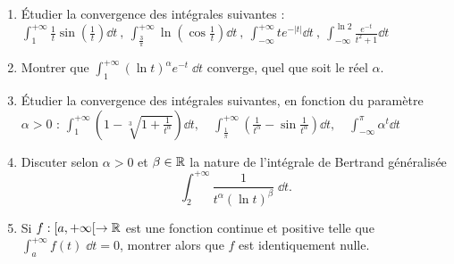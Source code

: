 \begin{frame}
\begin{miniexercice}
\begin{enumerate}
  \item \'Etudier la convergence des intégrales suivantes :  
  $\int_{1}^{+\infty} \frac{1}{t}\sin\left(\frac{1}{t}\right)\dd t \ ,\ 
  \int_{\frac{3}{\pi}}^{+\infty}\ln\left(\cos\frac{1}{t}\right)\dd t \ ,\ 
  \int_{-\infty}^{+\infty} te^{-|t|}\dd t \ ,\ 
  \int_{-\infty}^{\ln 2} \frac{e^{-t}}{t^2+1}\dd t$
  
  \item Montrer que $\int_1^{+\infty} (\ln t)^\alpha e^{-t}\;\dd t$ converge,
quel que soit le réel $\alpha$. 

  \item \'Etudier la convergence des intégrales suivantes, en fonction du paramètre $\alpha>0$ :
  $\int_{1}^{+\infty} \left(1-\sqrt[3]{1+\frac{1}{t^\alpha}}\right)\dd t , \quad
  \int_{\frac{1}{\pi}}^{+\infty} \left(\frac{1}{t^\alpha}-\sin\frac{1}{t^\alpha}\right)\dd t , \quad
  \int_{-\infty}^{\pi} \alpha^t \dd t$
  
  \item Discuter selon $\alpha>0$ et $\beta \in \mathbb{R}$ la nature de l'intégrale 
  de Bertrand généralisée
  $$\int_2^{+\infty} \frac{1}{t^\alpha(\ln t)^{\beta}}\;\dd t.$$
  
  \item Si $f : [a,+\infty[ \to \mathbb{R}$ est une fonction continue et positive telle que
  $\int_a^{+\infty} f(t)\;\dd t = 0$, montrer alors que $f$ est identiquement nulle.
\end{enumerate}
\end{miniexercice}
\end{frame}






